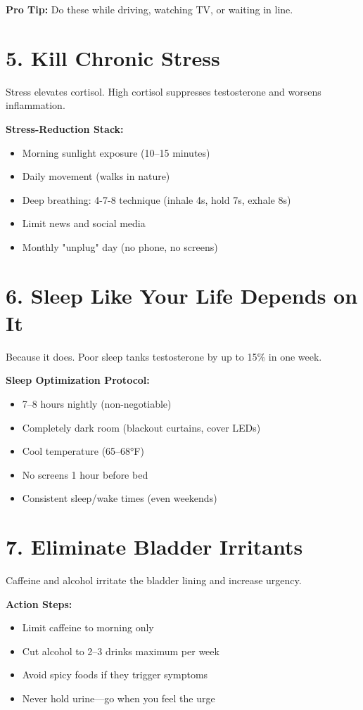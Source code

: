 \documentclass[11pt,oneside,openany]{book}
\begin{document}
\textbf{Pro Tip:} Do these while driving, watching TV, or waiting in line.

\section*{5. Kill Chronic Stress}
Stress elevates cortisol. High cortisol suppresses testosterone and worsens inflammation.

\textbf{Stress-Reduction Stack:}
\begin{itemize}[leftmargin=*]
\item Morning sunlight exposure (10--15 minutes)
\item Daily movement (walks in nature)
\item Deep breathing: 4-7-8 technique (inhale 4s, hold 7s, exhale 8s)
\item Limit news and social media
\item Monthly "unplug" day (no phone, no screens)
\end{itemize}

\section*{6. Sleep Like Your Life Depends on It}
Because it does. Poor sleep tanks testosterone by up to 15\% in one week.

\textbf{Sleep Optimization Protocol:}
\begin{itemize}[leftmargin=*]
\item 7--8 hours nightly (non-negotiable)
\item Completely dark room (blackout curtains, cover LEDs)
\item Cool temperature (65--68°F)
\item No screens 1 hour before bed
\item Consistent sleep/wake times (even weekends)
\end{itemize}

\section*{7. Eliminate Bladder Irritants}
Caffeine and alcohol irritate the bladder lining and increase urgency.

\textbf{Action Steps:}
\begin{itemize}[leftmargin=*]
\item Limit caffeine to morning only
\item Cut alcohol to 2--3 drinks maximum per week
\item Avoid spicy foods if they trigger symptoms
\item Never hold urine---go when you feel the urge
\end{itemize}
\end{document}

